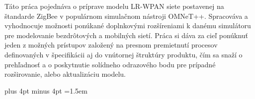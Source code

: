\documentclass[12pt,twoside,a4paper]{book}   %
\begin{document}

\vspace{8ex}

\noindent
Táto práca pojednáva o príprave modelu LR-WPAN siete postavenej na štandarde Zig\-Bee v populárnom simulačnom nástroji OMNeT++. Spracováva a vyhodnocuje možnosti ponúkané doplnkovými rozšíreniami k danému simulátoru pre modelovanie bezdrôtových a mobilných sietí. Práca si dáva za cieľ ponúknuť jeden z možných prístupov založený na presnom premietnutí procesov definovaných v špecifikácii aj do vnútornej štruktúry produktu, čím sa snaží o prehľadnosť a o poskytnutie solídneho odrazového bodu pre prípadné rozširovanie, alebo aktualizáciu modelu.

\noindent


\tableofcontents



\listoffigures



\listoftables



\mainbodystarts
\parskip=5pt plus 4pt minus 4pt
\parindent=1.5em


% 
% 

\cleardoublepage
\end{document}

